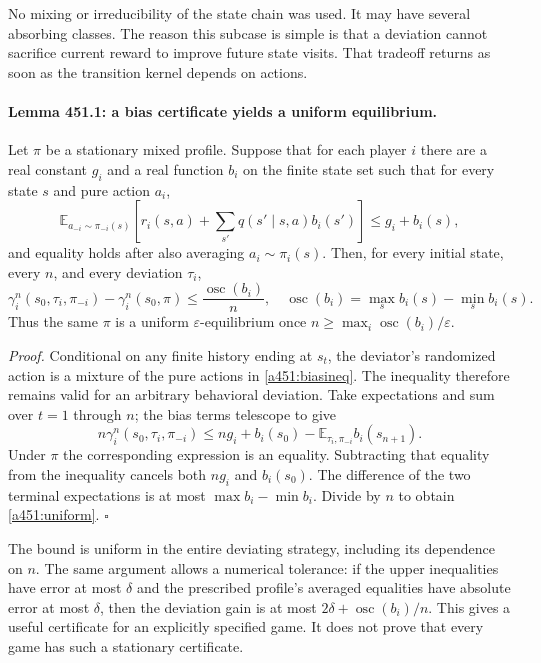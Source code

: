 \documentclass[11pt]{article}
\begin{document}
No mixing or irreducibility of the state chain was used. It may have
several absorbing classes. The reason this subcase is simple is that a
deviation cannot sacrifice current reward to improve future state visits.
That tradeoff returns as soon as the transition kernel depends on actions.

\paragraph{Lemma 451.1: a bias certificate yields a uniform equilibrium.}
Let $\pi$ be a stationary mixed profile. Suppose that for each player $i$
there are a real constant $g_i$ and a real function $b_i$ on the finite
state set such that for every state $s$ and pure action $a_i$,
\begin{equation}\label{a451:biasineq}
 \mathbb E_{a_{-i}\sim\pi_{-i}(s)}
 \left[r_i(s,a)+\sum_{s'}q(s'\mid s,a)b_i(s')\right]
 \le g_i+b_i(s),
\end{equation}
and equality holds after also averaging $a_i\sim\pi_i(s)$.
Then, for every initial state, every $n$, and every deviation $\tau_i$,
\begin{equation}\label{a451:uniform}
 \gamma_i^n(s_0,\tau_i,\pi_{-i})-\gamma_i^n(s_0,\pi)
 \le\frac{\operatorname{osc}(b_i)}n,
 \quad\operatorname{osc}(b_i)=\max_s b_i(s)-\min_s b_i(s).
\end{equation}
Thus the same $\pi$ is a uniform $\varepsilon$-equilibrium once
$n\ge\max_i\operatorname{osc}(b_i)/\varepsilon$.

\emph{Proof.} Conditional on any finite history ending at $s_t$, the
deviator's randomized action is a mixture of the pure actions in
\eqref{a451:biasineq}. The inequality therefore remains valid for an
arbitrary behavioral deviation. Take expectations and sum over $t=1$
through $n$; the bias terms telescope to give
\[
 n\gamma_i^n(s_0,\tau_i,\pi_{-i})
 \le ng_i+b_i(s_0)-\mathbb E_{\tau_i,\pi_{-i}}b_i(s_{n+1}).
\]
Under $\pi$ the corresponding expression is an equality. Subtracting
that equality from the inequality cancels both $ng_i$ and $b_i(s_0)$.
The difference of the two terminal expectations is at most
$\max b_i-\min b_i$. Divide by $n$ to obtain \eqref{a451:uniform}.
\hfill$\square$

The bound is uniform in the entire deviating strategy, including its
dependence on $n$. The same argument allows a numerical tolerance:
if the upper inequalities have error at most $\delta$ and the prescribed
profile's averaged equalities have absolute error at most $\delta$,
then the deviation gain is at most
$2\delta+\operatorname{osc}(b_i)/n$. This gives a useful certificate
for an explicitly specified game. It does not prove that every game has
such a stationary certificate.
\end{document}
